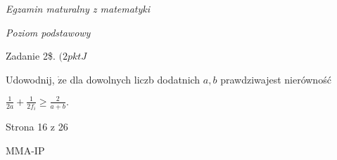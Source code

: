 \documentclass[a4paper,12pt]{article}
\begin{document}
{\it Egzamin maturalny z matematyki}

{\it Poziom podstawowy}

Zadanie 2{\$}. $(2pktJ$

Udowodnij, $\dot{\mathrm{z}}\mathrm{e}$ dla dowolnych liczb dodatnich $a, b$ prawdziwajest nierówność

$\displaystyle \frac{1}{2a}+\frac{1}{2f_{i}}\geq\frac{2}{a+b}.$

Strona 16 z 26

MMA-IP
\end{document}
